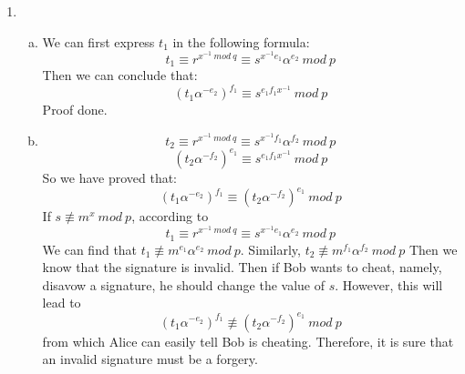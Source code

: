 \documentclass[12pt, a4paper]{article}
\begin{document}
\begin{enumerate}
    \item \begin{enumerate}[a)]
        \item We can first express $t_1$ in the following formula:
              $$t_1 \equiv r^{x^{-1}\ mod\ q} \equiv s^{x^{-1}e_1}\alpha^{e_2}\ mod\ p$$
              Then we can conclude that:
              $$(t_1\alpha^{-e_2})^{f_1} \equiv s^{e_1f_1x^{-1}}\ mod\ p$$
              Proof done.
        \item $$t_2 \equiv r^{x^{-1}\ mod\ q} \equiv s^{x^{-1}f_1}\alpha^{f_2}\ mod\ p$$
              $$(t_2\alpha^{-f_2})^{e_1} \equiv s^{e_1f_1x^{-1}}\ mod\ p$$
              So we have proved that:
              $$(t_1\alpha^{-e_2})^{f_1} \equiv (t_2\alpha^{-f_2})^{e_1}\ mod\ p$$
              If $s \not\equiv m^x\ mod\ p$, according to
              $$t_1 \equiv r^{x^{-1}\ mod\ q} \equiv s^{x^{-1}e_1}\alpha^{e_2}\ mod\ p$$
              We can find that $t_1 \not\equiv m^{e_1}\alpha^{e_2}\ mod\ p$. 
              Similarly, $t_2 \not\equiv m^{f_1}\alpha^{f_2}\ mod\ p$
              Then we know that the signature is invalid. Then if Bob wants to cheat, 
              namely, disavow a signature, he should change the value of $s$. 
              However, this will lead to 
              $$(t_1\alpha^{-e_2})^{f_1} \not\equiv (t_2\alpha^{-f_2})^{e_1}\ mod\ p$$
              from which Alice can easily tell Bob is cheating. Therefore, 
              it is sure that an invalid signature must be a forgery.
    \end{enumerate}


\end{enumerate}
\end{document}
